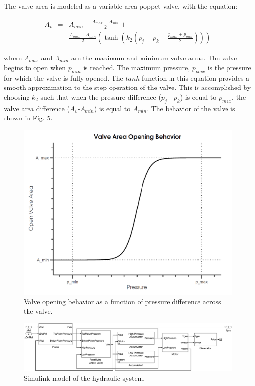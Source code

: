 \documentclass[twocolumn,10pt]{asme2e}
\begin{document}
The valve area is modeled as a variable area poppet valve, with the equation:  

\begin{eqnarray}
A_v &=& A_{min}+\frac{A_{max}-A_{min}}{2}+\nonumber\\
&& \frac{A_{max}-A_{min}}{2}(\tanh(k_2(p_j-p_k-\frac{p_{max}+p_{min}}{2})))
\end{eqnarray}

\noindent where $A_{max}$ and $A_{min}$ are the maximum and minimum valve areas. The valve begins to open when $p_{min}$ is reached. The maximum pressure, $p_{max}$ is the pressure for which the valve is fully opened.  The $tanh$ function in this equation provides a smooth approximation to the step operation of the 
valve. This is accomplished by choosing $k_2$ such that when the pressure difference ($p_j$ - $p_k$) is equal to $p_{max}$, the valve area difference ($A_{v}$-$A_{min}$) is equal to $A_{min}$. The behavior of the valve is shown in Fig. 5. 

\begin{figure}[t]
    \centering
    \includegraphics[width=1\columnwidth]{Images/ValveBehavior}
    \caption{Valve opening behavior as a function of pressure difference across the valve.}
    \end{figure}    

\begin{figure}[t]	
    \centering
    \includegraphics[width=2\columnwidth]{Images/ptomodel}  
    \caption{Simulink model of the hydraulic system.}
    \label{Hyd}
    \end{figure}
\end{document}
